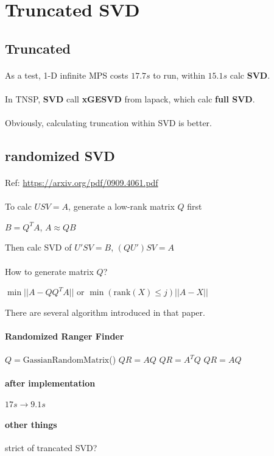 \documentclass{article}
\begin{document}
\section{Truncated SVD}

\subsection{Truncated}
\paragraph{}
As a test, 1-D infinite MPS costs $17.7 s$ to run, within $15.1 s$ calc \textbf{SVD}.

\paragraph{}
In TNSP, \textbf{SVD} call \textbf{xGESVD} from lapack, which calc \textbf{full SVD}.

\paragraph{}
Obviously, calculating truncation within SVD is better.

\subsection{randomized SVD}
\paragraph{}
Ref: \url{https://arxiv.org/pdf/0909.4061.pdf}

\paragraph{}
To calc $U S V = A$, generate a low-rank matrix $Q$ first

$B = Q^T A$, $A \approx QB$

Then calc SVD of $U' S V = B$, $(QU') S V = A$

\paragraph{}
How to generate matrix $Q$?

$\min ||A - QQ^TA||$
or
$\min(\mathrm{rank}(X) \le j) ||A-X||$

There are several algorithm introduced in that paper.

\paragraph{Randomized Ranger Finder}
\begin{algorithmic}
    \STATE $Q = \mathrm{GassianRandomMatrix}$()
    \LOOP
        \STATE $Q R = A Q$
        \STATE $Q R = A^T Q$
    \ENDLOOP
    \STATE $Q R = A Q$
\end{algorithmic}

\paragraph{after implementation}
$17s \rightarrow 9.1s$

\paragraph{other things}

strict of trancated SVD?
\end{document}
